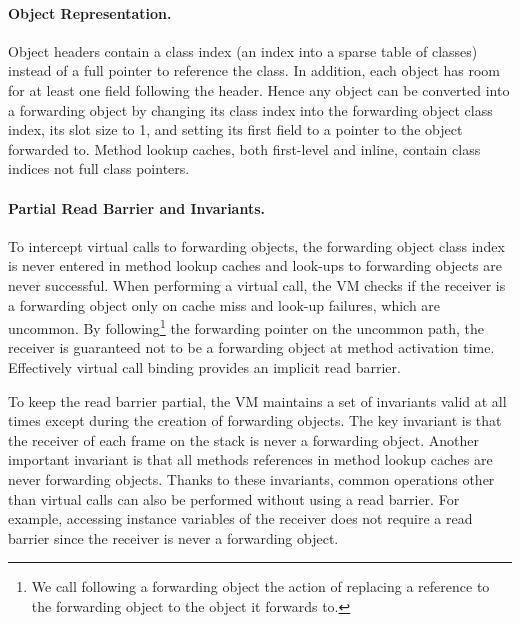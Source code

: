 \documentclass[sigplan,10pt,review,anonymous]{acmart}\settopmatter{printfolios=true,printccs=false,printacmref=false}
\begin{document}

\paragraph{Object Representation.}
Object headers contain a class index (an index into a sparse table of classes) instead of a full pointer to reference the class. In addition, each object has room for at least one field following the header. Hence any object can be converted into a forwarding object by changing its class index into the forwarding object class index, its slot size to 1, and setting its first field to a pointer to the object forwarded to. Method lookup caches, both first-level and inline, contain class indices not full class pointers.

\paragraph{Partial Read Barrier and Invariants.} 
To intercept virtual calls to forwarding objects, the forwarding object class index is never entered in method lookup caches and look-ups to forwarding objects are never successful. When performing a virtual call, the VM checks if the receiver is a forwarding object only on cache miss and look-up failures, which are uncommon. By following\footnote{We call following a forwarding object the action of replacing a reference to the forwarding object to the object it forwards to.} the forwarding pointer on the uncommon path, the receiver is guaranteed not to be a forwarding object at method activation time. Effectively virtual call binding provides an implicit read barrier.

To keep the read barrier partial, the VM maintains a set of invariants valid at all times except during the creation of forwarding objects. The key invariant is that the receiver of each frame on the stack is never a forwarding object. Another important invariant is that all methods references in method lookup caches are never forwarding objects.
Thanks to these invariants, common operations other than virtual calls can also be performed without using a read barrier. For example, accessing instance variables of the receiver does not require a read barrier since the receiver is never a forwarding object.
\end{document}
